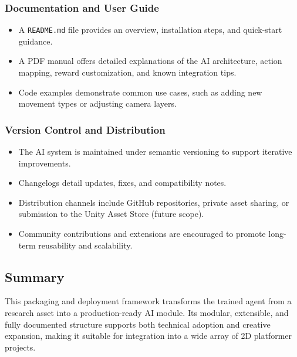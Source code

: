 \documentclass[12pt,oneside,openright,a4paper]{cpe-english-project}
\begin{document}
\subsubsection{Documentation and User Guide}

\begin{itemize}
\item A \texttt{README.md} file provides an overview, installation steps, and quick-start guidance.
\item A PDF manual offers detailed explanations of the AI architecture, action mapping, reward customization, and known integration tips.
\item Code examples demonstrate common use cases, such as adding new movement types or adjusting camera layers.
\end{itemize}

\subsubsection{Version Control and Distribution}

\begin{itemize}
\item The AI system is maintained under semantic versioning to support iterative improvements.
\item Changelogs detail updates, fixes, and compatibility notes.
\item Distribution channels include GitHub repositories, private asset sharing, or submission to the Unity Asset Store (future scope).
\item Community contributions and extensions are encouraged to promote long-term reusability and scalability.
\end{itemize}

\subsection{Summary}
This packaging and deployment framework transforms the trained agent from a research asset into a production-ready AI module. Its modular, extensible, and fully documented structure supports both technical adoption and creative expansion, making it suitable for integration into a wide array of 2D platformer projects.

\end{document}
